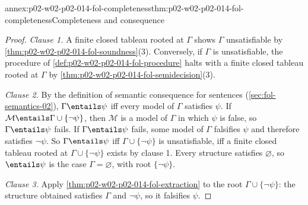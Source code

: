 \begin{annexitem}{annex:p02-w02-p02-014-fol-completeness}{thm:p02-w02-p02-014-fol-completeness}{Completeness and consequence}
\begin{proof}
\emph{Clause 1.}  A finite closed tableau rooted at \(\Gamma\) shows
\(\Gamma\) unsatisfiable by \cref{thm:p02-w02-p02-014-fol-soundness}(3).
Conversely, if \(\Gamma\) is unsatisfiable, the procedure of
\cref{def:p02-w02-p02-014-fol-procedure} halts with a finite closed tableau
rooted at \(\Gamma\) by \cref{thm:p02-w02-p02-014-fol-semidecision}(3).

\emph{Clause 2.}  By the definition of semantic consequence for sentences
(\cref{sec:fol-semantics-02}), \(\Gamma\entails\psi\) iff every model of
\(\Gamma\) satisfies \(\psi\).  If \(\mathcal M\entails\Gamma\cup\{\neg\psi\}\),
then \(\mathcal M\) is a model of \(\Gamma\) in which \(\psi\) is false, so
\(\Gamma\entails\psi\) fails.  If \(\Gamma\entails\psi\) fails, some model of
\(\Gamma\) falsifies \(\psi\) and therefore satisfies \(\neg\psi\).  So
\(\Gamma\entails\psi\) iff \(\Gamma\cup\{\neg\psi\}\) is unsatisfiable, iff
a finite closed tableau rooted at \(\Gamma\cup\{\neg\psi\}\) exists by
clause 1.  Every structure satisfies \(\varnothing\), so \(\entails\psi\) is
the case \(\Gamma=\varnothing\), with root \(\{\neg\psi\}\).

\emph{Clause 3.}  Apply \cref{thm:p02-w02-p02-014-fol-extraction} to the root
\(\Gamma\cup\{\neg\psi\}\): the structure obtained satisfies \(\Gamma\) and
\(\neg\psi\), so it falsifies \(\psi\).
\end{proof}
\end{annexitem}
